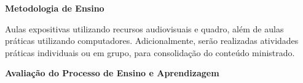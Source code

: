 
  
 
 


\begin{snugshade}\begin{center}\textbf{
    Metodologia de Ensino
}\end{center}\end{snugshade} 

\noindent
   Aulas expositivas utilizando recursos audiovisuais e quadro, além de aulas práticas utilizando computadores. Adicionalmente, serão realizadas atividades práticas individuais ou em grupo, para consolidação do conteúdo ministrado.

\begin{snugshade}\begin{center}\textbf{
    Avaliação do Processo de Ensino e Aprendizagem
}\end{center}\end{snugshade}   

